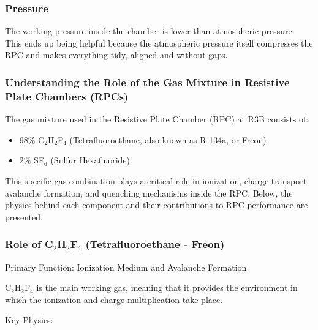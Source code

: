 \subsubsection{Pressure}

The working pressure inside the chamber is lower than atmospheric pressure. This ends up being helpful because the atmospheric pressure itself compresses the RPC and makes everything tidy, aligned and without gaps.


\subsubsection{Understanding the Role of the Gas Mixture in Resistive Plate Chambers (RPCs)}

The gas mixture used in the Resistive Plate Chamber (RPC) at R3B consists of:

\begin{itemize}
	\item 98\% C$_2$H$_2$F$_4$ (Tetrafluoroethane, also known as R-134a, or Freon)
	\item 2\% SF$_6$ (Sulfur Hexafluoride).
\end{itemize}


This specific gas combination plays a critical role in ionization, charge transport, avalanche formation, and quenching mechanisms inside the RPC. Below, the physics behind each component and their contributions to RPC performance are presented.


\subsubsection{Role of C$_2$H$_2$F$_4$ (Tetrafluoroethane - Freon)}

Primary Function: Ionization Medium and Avalanche Formation

C$_2$H$_2$F$_4$ is the main working gas, meaning that it provides the environment in which the ionization and charge multiplication take place.

Key Physics:

